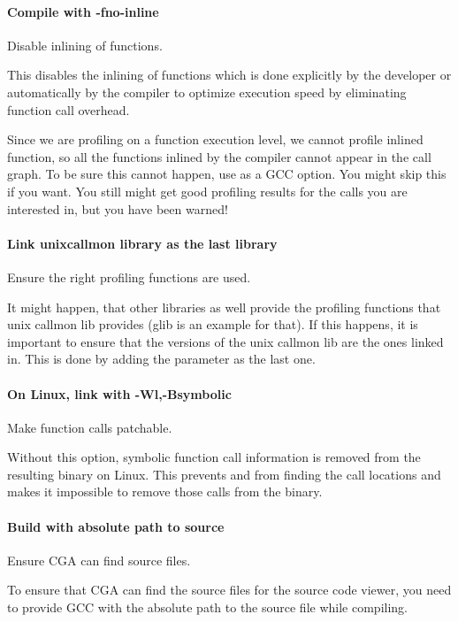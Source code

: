 \paragraph{Compile with -fno-inline} Disable inlining of functions.

This disables the inlining of functions which is done explicitly by the developer or automatically by the compiler to optimize execution speed by eliminating function call overhead.

Since we are profiling on a function execution level, we cannot profile inlined function, so all the functions inlined by the compiler cannot appear in the call graph. To be sure this cannot happen, use  as a GCC option. You might skip this if you want. You still might get good profiling results for the calls you are interested in, but you have been warned!

\paragraph{Link unixcallmon library as the last library} Ensure the right profiling functions are used.

It might happen, that other libraries as well provide the profiling functions that unix callmon lib provides (glib is an example for that). If this happens, it is important to ensure that the versions of the unix callmon lib are the ones linked in. This is done by adding the  parameter as the last one.

\paragraph{On Linux, link with -Wl,-Bsymbolic} Make function calls patchable.


Without this option, symbolic function call information is removed from the resulting binary on Linux. This prevents  and  from finding the call locations and makes it impossible to remove those calls from the binary. 

\paragraph{Build with absolute path to source} Ensure CGA can find source files.

To ensure that CGA can find the source files for the source code viewer, you need to provide GCC with the absolute path to the source file while compiling.

